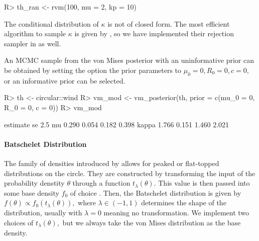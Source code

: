 \begin{CodeChunk}

\begin{CodeInput}
R> th_ran <- rvm(100, mu = 2, kp = 10)
\end{CodeInput}
\end{CodeChunk}

The conditional distribution of \(\kappa\) is not of closed form. The
most efficient algorithm to sample \(\kappa\) is given by
\citet{forbes2015fast}, so we have implemented their rejection sampler
in  as well.

An MCMC sample from the von Mises posterior with an uninformative prior
can be obtained by setting the option the prior parameters to
\(\mu_0 = 0, R_0 = 0, c = 0,\) or an informative prior can be selected.

\begin{CodeChunk}

\begin{CodeInput}
R> th     <- circular::wind
R> vm_mod <- vm_posterior(th, prior = c(mu_0 = 0, R_0 = 0, c = 0))
R> vm_mod
\end{CodeInput}

\begin{CodeOutput}
      estimate    se  2.5%
mu       0.290 0.054 0.182 0.398
kappa    1.766 0.151 1.460 2.021
\end{CodeOutput}
\end{CodeChunk}

\hypertarget{batschelet-distribution}{%
\paragraph{Batschelet Distribution}\label{batschelet-distribution}}

The family of densities introduced by \citet{batschelet1981circular}
allows for peaked or flat-topped distributions on the circle. They are
constructed by transforming the input of the probability denstity
\(\theta\) through a function \(t_{\lambda}(\theta).\) This value is
then passed into some base density \(f_0\) of choice
\citep{abe2010symmetric, pewsey2011extension}. Then, the Batschelet
distribution is given by \(f(\theta) \propto f_0(t_\lambda(\theta)),\)
where \(\lambda \in (-1, 1)\) determines the shape of the distribution,
usually with \(\lambda = 0\) meaning no transformation. We implement two
choices of \(t_{\lambda}(\theta),\) but we always take the von Mises
distribution as the base density.


